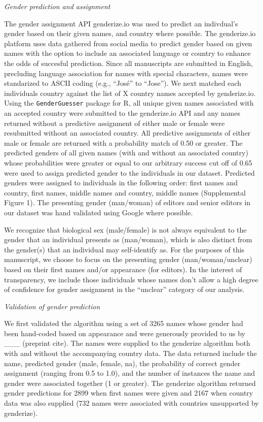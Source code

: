 \documentclass[11pt,]{article}
\begin{document}
\emph{Gender prediction and assignment}

The gender assignment API genderize.io was used to predict an
indivdual's gender based on their given names, and country where
possible. The genderize.io platform uses data gathered from social media
to predict gender based on given names with the option to include an
associated language or country to enhance the odds of succesful
prediction. Since all manuscripts are submitted in English, precluding
language association for names with special characters, names were
standarized to ASCII coding (e.g., ``José'' to ``Jose''). We next
matched each individuals country against the list of X country names
accepted by genderize.io. Using the \texttt{GenderGuesser} package for
R, all unique given names associated with an accepted country were
submitted to the genderize.io API and any names returned without a
predictive assignment of either male or female were resubmitted without
an associated country. All predictive assignments of either male or
female are returned with a probability match of 0.50 or greater. The
predicted genders of all given names (with and without an associated
country) whose probabilities were greater or equal to our arbitrary
success cut off of 0.65 were used to assign predicted gender to the
individuals in our dataset. Predicted genders were assigned to
individuals in the following order: first names and country, first
names, middle names and country, middle names (Supplemental Figure 1).
The presenting gender (man/woman) of editors and senior editors in our
dataset was hand validated using Google where possible.

We recognize that biological sex (male/female) is not always equivalent
to the gender that an individual presents as (man/woman), which is also
distinct from the gender(s) that an individual may self-identify as. For
the purposes of this manuscript, we choose to focus on the presenting
gender (man/woman/unclear) based on their first names and/or appearance
(for editors). In the interest of transparency, we include those
individuals whose names don't allow a high degree of confidence for
gender assignment in the ``unclear'' category of our analysis.

\emph{Validation of gender prediction}

We first validated the algorithm using a set of 3265 names whose gender
had been hand-coded based on appearance and were generously provided to
us by \_\_\_ (preprint cite). The names were supplied to the genderize
algorithm both with and without the accompanying country data. The data
returned include the name, predicted gender (male, female, na), the
probability of correct gender assignment (ranging from 0.5 to 1.0), and
the number of instances the name and gender were associated together (1
or greater). The genderize algorithm returned gender predictions for
2899 when first names were given and 2167 when country data was also
supplied (732 names were associated with countries unsupported by
genderize).
\end{document}
